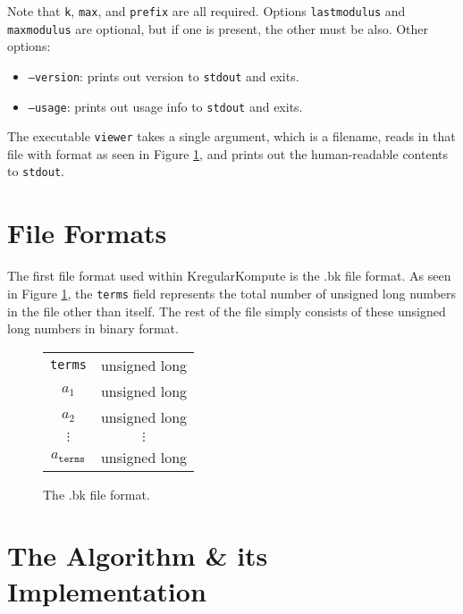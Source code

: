 \documentclass[11pt]{article}
\newcommand{\ul}{ \textcolor{OliveGreen}{unsigned long }}
\begin{document}
\noindent Note that \texttt{k}, \texttt{max}, and \texttt{prefix} are all required.
Options \texttt{lastmodulus} and \texttt{maxmodulus}
are optional, but if one is present, the other must be also. Other options:
\begin{itemize}
	\item { \scriptsize \texttt{--version}}: prints out version to \texttt{stdout} and exits.
	\item { \scriptsize \texttt{--usage}}: prints out usage info to \texttt{stdout} and exits.
\end{itemize}

The executable \texttt{viewer} takes a single argument, which is a filename, reads in that file with format as seen in Figure \ref{bkFileFormat},
and prints out the human-readable contents to \texttt{stdout}.

\section{File Formats}

The first file format used within KregularKompute is the .bk file format.
As seen in Figure \ref{bkFileFormat}, the \texttt{terms} field represents
the total number of unsigned long numbers in the file other than itself.
The rest of the file simply consists of these unsigned long numbers in
binary format.

\begin{figure}[h]
	\begin{center}
		\begin{tabular}{|c|c}
		\cline{1-1}
		\texttt{terms} & \ul \\
		\cline{1-1}
		$a_1$ & \ul \\
		\cline{1-1}
		$a_2$ & \ul \\
		$\vdots$ & $\vdots$\\
		\cline{1-1}
		$a_\texttt{terms}$ & \ul \\
		\cline{1-1}
		\end{tabular}
	\end{center}
	
	
	\caption{ The .bk file format. \label{bkFileFormat} }
\end{figure}

\section{The Algorithm \& its Implementation}
\end{document}
